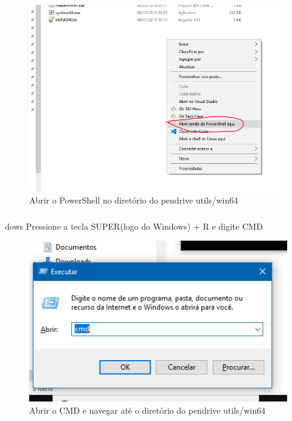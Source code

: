 \documentclass{beamer}
\begin{document}
\begin{frame}
    \frametitle{\insertsection}
    \framesubtitle{\insertsubsection}
    
    \begin{figure}
        \centering
        \includegraphics[scale=0.42]{images/pendrivewin1abrirpower.png}
        \caption{Abrir o PowerShell no diretório do pendrive utils/win64}
    \end{figure}
  
\end{frame}
\begin{frame}
    \frametitle{\insertsection}
    \framesubtitle{\insertsubsection}
      \begin{block}{\insertsubsection dows}
    \justifying Pressione a tecla SUPER(logo do Windows) + R e digite CMD
    \end{block}
    \begin{figure}
        \centering
        \includegraphics[scale=0.6]{images/pendrivewin2.png}
        \caption{Abrir o CMD e navegar até o diretório do pendrive utils/win64}
    \end{figure}
  
\end{frame}
\end{document}
